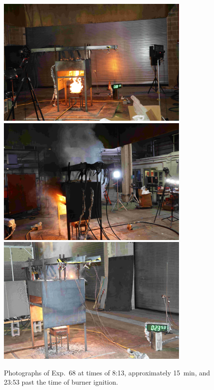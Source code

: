 \begin{figure}[p]
\centering
\includegraphics[height=2.50in]{../FIGURES/Test_68_Photo_1} \\ \vspace{0.1in}
\includegraphics[height=2.50in]{../FIGURES/Test_68_Photo_2} \\ \vspace{0.1in}
\includegraphics[height=2.50in]{../FIGURES/Test_68_Photo_3}
\caption[Photographs of Exp.~68]{Photographs of Exp.~68 at times of 8:13, approximately 15~min, and 23:53 past the time of burner ignition.}
\label{fig:Test_68_photos}
\end{figure}



